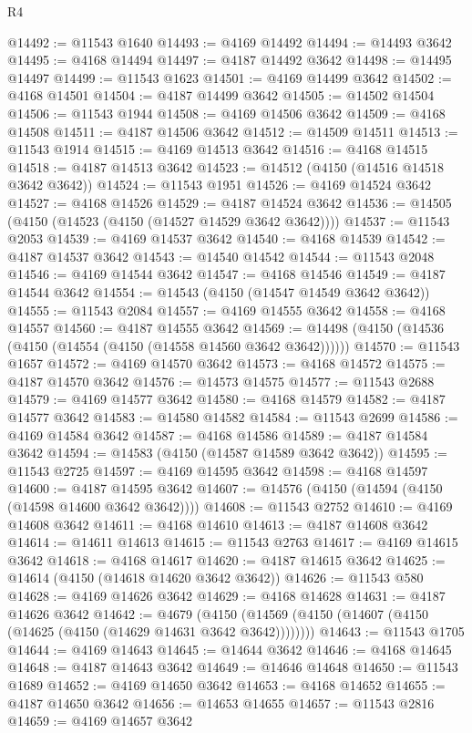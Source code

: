 \begin{lexlean}{R4}
\begin{coremodule}
@14492 := @11543 @1640
@14493 := @4169 @14492
@14494 := @14493 @3642
@14495 := @4168 @14494
@14497 := @4187 @14492 @3642
@14498 := @14495 @14497
@14499 := @11543 @1623
@14501 := @4169 @14499 @3642
@14502 := @4168 @14501
@14504 := @4187 @14499 @3642
@14505 := @14502 @14504
@14506 := @11543 @1944
@14508 := @4169 @14506 @3642
@14509 := @4168 @14508
@14511 := @4187 @14506 @3642
@14512 := @14509 @14511
@14513 := @11543 @1914
@14515 := @4169 @14513 @3642
@14516 := @4168 @14515
@14518 := @4187 @14513 @3642
@14523 := @14512 (@4150 (@14516 @14518 @3642 @3642))
@14524 := @11543 @1951
@14526 := @4169 @14524 @3642
@14527 := @4168 @14526
@14529 := @4187 @14524 @3642
@14536 := @14505 (@4150 (@14523 (@4150 (@14527 @14529 @3642 @3642))))
@14537 := @11543 @2053
@14539 := @4169 @14537 @3642
@14540 := @4168 @14539
@14542 := @4187 @14537 @3642
@14543 := @14540 @14542
@14544 := @11543 @2048
@14546 := @4169 @14544 @3642
@14547 := @4168 @14546
@14549 := @4187 @14544 @3642
@14554 := @14543 (@4150 (@14547 @14549 @3642 @3642))
@14555 := @11543 @2084
@14557 := @4169 @14555 @3642
@14558 := @4168 @14557
@14560 := @4187 @14555 @3642
@14569 := @14498 (@4150 (@14536 (@4150 (@14554 (@4150 (@14558 @14560 @3642 @3642))))))
@14570 := @11543 @1657
@14572 := @4169 @14570 @3642
@14573 := @4168 @14572
@14575 := @4187 @14570 @3642
@14576 := @14573 @14575
@14577 := @11543 @2688
@14579 := @4169 @14577 @3642
@14580 := @4168 @14579
@14582 := @4187 @14577 @3642
@14583 := @14580 @14582
@14584 := @11543 @2699
@14586 := @4169 @14584 @3642
@14587 := @4168 @14586
@14589 := @4187 @14584 @3642
@14594 := @14583 (@4150 (@14587 @14589 @3642 @3642))
@14595 := @11543 @2725
@14597 := @4169 @14595 @3642
@14598 := @4168 @14597
@14600 := @4187 @14595 @3642
@14607 := @14576 (@4150 (@14594 (@4150 (@14598 @14600 @3642 @3642))))
@14608 := @11543 @2752
@14610 := @4169 @14608 @3642
@14611 := @4168 @14610
@14613 := @4187 @14608 @3642
@14614 := @14611 @14613
@14615 := @11543 @2763
@14617 := @4169 @14615 @3642
@14618 := @4168 @14617
@14620 := @4187 @14615 @3642
@14625 := @14614 (@4150 (@14618 @14620 @3642 @3642))
@14626 := @11543 @580
@14628 := @4169 @14626 @3642
@14629 := @4168 @14628
@14631 := @4187 @14626 @3642
@14642 := @4679
    (@4150 (@14569 (@4150 (@14607 (@4150 (@14625 (@4150 (@14629 @14631 @3642 @3642))))))))
@14643 := @11543 @1705
@14644 := @4169 @14643
@14645 := @14644 @3642
@14646 := @4168 @14645
@14648 := @4187 @14643 @3642
@14649 := @14646 @14648
@14650 := @11543 @1689
@14652 := @4169 @14650 @3642
@14653 := @4168 @14652
@14655 := @4187 @14650 @3642
@14656 := @14653 @14655
@14657 := @11543 @2816
@14659 := @4169 @14657 @3642

\end{coremodule}
\end{lexlean}
